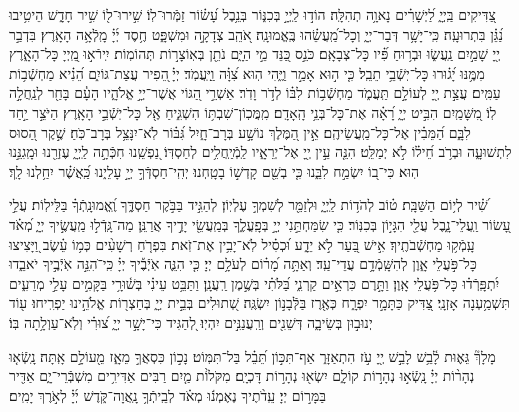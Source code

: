 \documentclass[twoside, openany, parskip=half, 11pt]{book}
\begin{document}
 
צַ֭דִּיקִים בַּֽיְיָ֑ לַ֝יְשָׁרִ֗ים נָאוָ֥ה תְהִלָּֽה׃
הוֹד֣וּ לַֽיְיָ֣ בְּכִנּ֑וֹר בְּנֵ֥בֶל עָ֝שׂ֗וֹר זַמְּֿרוּ־לֽוֹ׃
שִׁ֣ירוּ־ל֖וֹ שִׁ֣יר חָדָ֑שׁ הֵיטִ֥יבוּ נַ֝גֵּ֗ן בִּתְרוּעָֽה׃
כִּֽי־יָשָׁ֥ר דְּבַר־יְיָ֑ וְכָל־מַֽ֝עֲשֵׂ֗הוּ בֶּֽאֱמוּנָֽה׃
אֹ֭הֵֽב צְדָקָ֣ה וּמִשְׁפָּ֑ט חֶ֥סֶד יְ֜יָ֗ מָֽלְֿאָ֥ה הָאָֽרֶץ׃
בִּדְבַ֣ר יְ֖יָ שָׁמַ֣יִם נַֽעֲשׂ֑וּ וּבְר֥וּחַ פִּ֝֗יו כָּל־צְבָאָֽם׃
כֹּנֵ֣ס כַּ֭נֵּד מֵ֣י הַיָּ֑ם נֹתֵ֖ן בְּאֽוֹצָר֣וֹת תְּהוֹמֽוֹת׃
יִֽירֿא֣וּ מֵֽ֭יְיָ כָּל־הָאָ֑רֶץ מִמֶּ֥נּוּ יָ֝ג֗וּרוּ כָּל־יֽשְֿׁבֵ֥י תֵבֵֽל׃
כִּ֤י ה֣וּא אָמַ֣ר וַיֶּ֑הִי הֽוּא צִ֝וָּ֗ה וַֽיַּֽעֲמֹֽד׃
יְיָ֗ ֖הֵפִיר עֲצַת־גּוֹיִ֑ם הֵ֝נִ֗יא מַחְשְֿׁב֥וֹת עַמִּֽים׃
עֲצַ֣ת יְ֖יָ לְעוֹלָ֣ם תַּֽעֲמֹ֑ד מַחְשְֿׁב֥וֹת לִבּ֗וֹ לְדֹ֣ר וָדֹֽר׃
אַשְׁרֵ֣י הַ֭גּוֹי אֲשֶׁר־יְיָ֣ אֱלֹהָ֑יו הָעָ֓ם בָּחַ֖ר לְנַֽחֲלָ֣ה לֽוֹ׃
מִ֭שָּׁמַֽיִם הִבִּ֣יט יְיָ֑ רָ֝אָ֗ה אֶת־כָּל־בְּנֵ֥י הָֽאָדָֽם׃
מִֽמֲּכֽוֹן־שִׁבְתּ֥וֹ הִשְׁגִּ֑יחַ אֶ֖ל כָּל־יֽשְֿׁבֵ֣י הָאָֽרֶץ׃
הַיֹּצֵ֣ר יַ֣חַד לִבָּ֑ם הַ֝מֵּבִ֗ין אֶל־כָּל־מַֽעֲשֵׂיהֶֽם׃
אֵ֣ין הַ֭מֶּלֶךְ נוֹשָׁ֣ע בְּרָב־חָ֑יִל גִּ֝בּ֗וֹר לֹֽא־יִנָּצֵ֥ל בְּרָב־כֹּֽחַ׃
שֶׁ֣קֶר הַ֭סוּס לִתְשׁוּעָ֑ה וּבְרֹ֥ב חֵ֝יל֗וֹ לֹ֣א יְמַלֵּֽט׃
הִנֵּ֤ה עֵ֣ין יְ֖יָ אֶל־יְרֵאָ֑יו לַֽמְֿיַֽחֲלִ֥ים לְחַסְדּֽוֹ׃
נַ֭פְשֵֽׁנוּ חִכְּֿתָ֣ה לַֽיְיָ֑ עֶזְרֵ֖נוּ וּמָֽגִנֵּ֣נוּ הֽוּא׃
כִּי־ב֭וֹ יִשְׂמַ֣ח לִבֵּ֑נוּ כִּ֤י בְשֵׁ֖ם קָדְשׁ֣וֹ בָטָֽחְנוּ׃
יְהִֽי־חַסְדְּֿךָ֣ יְיָ֣ עָלֵי֑נוּ כַּֽ֝אֲשֶׁ֗ר יִחַ֥לְנוּ לָֽךְ׃

 
שִׁ֝֗יר לְי֥וֹם הַשַּׁבָּֽת׃
ט֗וֹב לְהֹד֥וֹת לַֽיְיָ֑ וּלְזַמֵּ֖ר לְשִׁמְךָ֣ עֶלְיֽוֹן׃
לְהַגִּ֣יד בַּבֹּ֣קֶר חַסְדֶּ֑ךָ וֶֽ֝אֱמוּנָֽתְֿךָ֗ בַּלֵּילֽוֹת׃
עֲלֵ֣י עָ֭שׂוֹר וַֽעֲלֵי־נָ֑בֶל עֲלֵ֖י הִגָּי֣וֹן בְּכִנּֽוֹר׃
כִּ֤י שִׂמַּחְתַּ֣נִי יְיָ֣ בְּפָֽעֳלֶ֑ךָ בְּמַֽעֲשֵׂ֖י יָדֶ֣יךָ אֲרַנֵּֽן׃
מַה־גָּֽדְֿל֣וּ מַֽעֲשֶׂ֣יךָ יְיָ֑ מְ֝אֹ֗ד עָֽמְֿק֥וּ מַחְשְֿׁבֹתֶֽיךָ׃
אִ֣ישׁ בַּ֭עַר לֹ֣א יֵדָ֑ע וּ֝כְסִ֗יל לֹֽא־יָבִ֥ין אֶת־זֹֽאת׃
בִּפְרֹ֤חַ רְשָׁעִ֨ים כְּמ֥וֹ עֵ֗שֶׂב וַ֭יָּצִיצוּ כָּל־פֹּ֣עֲלֵי אָ֑וֶן לְהִשָּֽׁמְֿדָ֥ם עֲדֵי־עַֽד׃
וְאַתָּ֥ה מָ֝ר֗וֹם לְעֹלָ֥ם יְיָ׃
כִּ֤י הִנֵּ֢ה אֹֽיְֿבֶ֡יךָ יְיָ֗ כִּֽי־ֹהִנֵּ֣ה אֹֽיְֿבֶ֣יךָ יֹאבֵ֑דוּ יִ֝תְפָּֽרְֿד֗וּ כָּל־פֹּ֥עֲלֵי אָֽוֶן׃
וַתָּ֣רֶם כִּרְאֵ֣ים קַרְנִ֑י בַּ֝לֹּתִ֗י בְּשֶׁ֣מֶן רַֽעֲנָֽן׃
וַתַּבֵּ֥ט עֵינִ֗י בְּשׁ֫וּרָ֥י בַּקָּמִ֣ים עָלַ֣י מְרֵעִ֑ים תִּשְׁמַ֥עְנָה אָזְנָֽי׃
צַ֭דִּיק כַּתָּמָ֣ר יִפְרָ֑ח כְּאֶ֖רֶז בַּלְּֿבָנ֣וֹן יִשְׂגֶּֽה׃
שְׁ֭תוּלִים בְּבֵ֣ית יְיָ֑ בְּחַצְר֖וֹת אֱלֹהֵ֣ינוּ יַפְרִֽיחוּ׃
ע֖וֹד יְנוּב֣וּן בְּשֵׂיבָ֑ה דְּשֵׁנִ֖ים וְרַֽעֲנַנִּ֣ים יִהְיֽוּ׃
לְ֭הַגִּיד כִּי־יָשָׁ֣ר יְיָ֑ צ֝וּרִ֗י וְלֹֽא־עַוְלָ֥תָה בּֽוֹ׃

 
 מָלָךְ֘ גֵּא֢וּת לָ֫בֵ֥שׁ לָבֵ֣שׁ יְ֖יָ עֹ֣ז הִתְאַזָּר֑ אַף־תִּכּ֣וֹן תֵּ֝בֵ֗ל בַּל־תִּמּֽוֹט׃
נָכ֣וֹן כִּסְאֲךָ֣ מֵאָ֑ז מֵ֖עוֹלָ֣ם אָֽתָּה׃
נָֽשְֿׂא֤וּ נְהָר֨וֹת יְיָ֗ נָֽשְֿׂא֣וּ נְהָר֣וֹת קוֹלָ֑ם יִשְׂא֖וּ נְהָר֣וֹת דָּכְיָֽם׃
מִקֹּלוֹ֨ת מַ֤יִם רַבִּים אַדִּירִ֥ים מִשְׁבְּֿרֵי־יָ֑ם אַדִּ֖יר בַּמָּר֣וֹם יְיָ׃
עֵֽדֹ֨תֶיךָ נֶאֶמְנ֬וּ מְאֹ֗ד לְבֵֽיתְֿךָ֥ נָֽאֲוָה־קֹּ֑דֶשׁ יְ֜יָ֗ לְאֹ֣רֶךְ יָמִֽים׃
\end{document}

